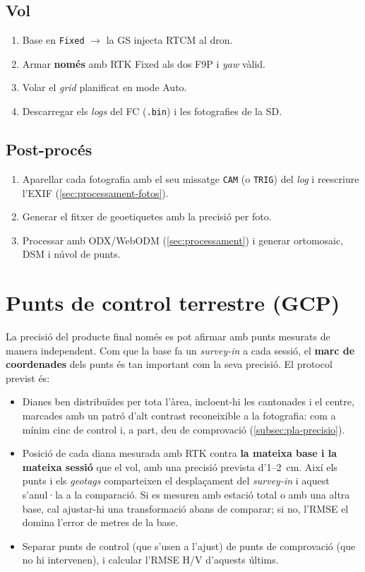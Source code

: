 \subsection{Vol}
\begin{enumerate}[label=\alph*)]
    \item Base en \texttt{Fixed} $\rightarrow$ la GS injecta RTCM al dron.
    \item Armar \textbf{només} amb RTK Fixed als dos F9P i \emph{yaw} vàlid.
    \item Volar el \emph{grid} planificat en mode Auto.
    \item Descarregar els \emph{logs} del FC (\texttt{.bin}) i les fotografies de la SD.
\end{enumerate}

\subsection{Post-procés}
\begin{enumerate}[label=\alph*)]
    \item Aparellar cada fotografia amb el seu missatge \texttt{CAM} (o \texttt{TRIG}) del \emph{log} i reescriure l'EXIF (\cref{sec:processament-fotos}).
    \item Generar el fitxer de geoetiquetes amb la precisió per foto.
    \item Processar amb ODX/WebODM (\cref{sec:processament}) i generar ortomosaic, DSM i núvol de punts.
\end{enumerate}

\section{Punts de control terrestre (GCP)}
\label{sec:gcp}

La precisió del producte final només es pot afirmar amb punts mesurats de manera independent. Com que la base fa un \emph{survey-in} a cada sessió, el \textbf{marc de coordenades} dels punts és tan important com la seva precisió. El protocol previst és:
\begin{itemize}
    \item Dianes ben distribuïdes per tota l'àrea, incloent-hi les cantonades i el centre, marcades amb un patró d'alt contrast reconeixible a la fotografia: com a mínim cinc de control i, a part, deu de comprovació (\cref{subsec:pla-precisio}).
    \item Posició de cada diana mesurada amb RTK contra \textbf{la mateixa base i la mateixa sessió} que el vol, amb una precisió prevista d'1--2~cm. Així els punts i els \emph{geotags} comparteixen el desplaçament del \emph{survey-in} i aquest s'anul·la a la comparació. Si es mesuren amb estació total o amb una altra base, cal ajustar-hi una transformació abans de comparar; si no, l'RMSE el domina l'error de metres de la base.
    \item Separar punts de control (que s'usen a l'ajust) de punts de comprovació (que no hi intervenen), i calcular l'RMSE H/V d'aquests últims.
\end{itemize}

